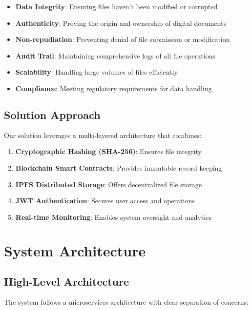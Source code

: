 \documentclass[11pt,a4paper]{article}
\begin{document}
\begin{itemize}
    \item \textbf{Data Integrity}: Ensuring files haven't been modified or corrupted
    \item \textbf{Authenticity}: Proving the origin and ownership of digital documents
    \item \textbf{Non-repudiation}: Preventing denial of file submission or modification
    \item \textbf{Audit Trail}: Maintaining comprehensive logs of all file operations
    \item \textbf{Scalability}: Handling large volumes of files efficiently
    \item \textbf{Compliance}: Meeting regulatory requirements for data handling
\end{itemize}

\subsection{Solution Approach}
Our solution leverages a multi-layered architecture that combines:

\begin{enumerate}
    \item \textbf{Cryptographic Hashing (SHA-256)}: Ensures file integrity
    \item \textbf{Blockchain Smart Contracts}: Provides immutable record keeping
    \item \textbf{IPFS Distributed Storage}: Offers decentralized file storage
    \item \textbf{JWT Authentication}: Secures user access and operations
    \item \textbf{Real-time Monitoring}: Enables system oversight and analytics
\end{enumerate}

\section{System Architecture}

\subsection{High-Level Architecture}
The system follows a microservices architecture with clear separation of concerns:
\end{document}
